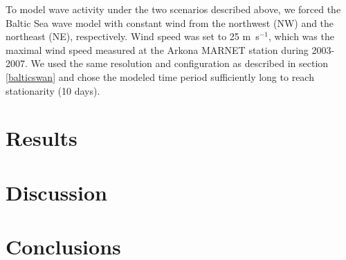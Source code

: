 To model wave activity under the two scenarios described above, we forced the 
Baltic Sea wave model with constant wind from the northwest (NW) and the 
northeast (NE), respectively. Wind speed was set to 25 m~s$^{-1}$, which was 
the maximal wind speed measured at the Arkona MARNET station during 2003-2007. 
We used the same resolution and configuration as described in 
section \ref{balticswan} and chose the modeled time period sufficiently long to 
reach stationarity (10 days).

\section{Results}	


\section{Discussion}

\section{Conclusions}